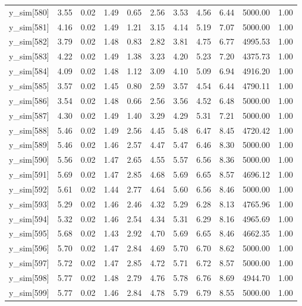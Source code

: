 \begin{table}[ht]
\begin{tabular}{rrrrrrrrrrr}
  y\_sim[580] & 3.55 & 0.02 & 1.49 & 0.65 & 2.56 & 3.53 & 4.56 & 6.44 & 5000.00 & 1.00 \\ 
  y\_sim[581] & 4.16 & 0.02 & 1.49 & 1.21 & 3.15 & 4.14 & 5.19 & 7.07 & 5000.00 & 1.00 \\ 
  y\_sim[582] & 3.79 & 0.02 & 1.48 & 0.83 & 2.82 & 3.81 & 4.75 & 6.77 & 4995.53 & 1.00 \\ 
  y\_sim[583] & 4.22 & 0.02 & 1.49 & 1.38 & 3.23 & 4.20 & 5.23 & 7.20 & 4375.73 & 1.00 \\ 
  y\_sim[584] & 4.09 & 0.02 & 1.48 & 1.12 & 3.09 & 4.10 & 5.09 & 6.94 & 4916.20 & 1.00 \\ 
  y\_sim[585] & 3.57 & 0.02 & 1.45 & 0.80 & 2.59 & 3.57 & 4.54 & 6.44 & 4790.11 & 1.00 \\ 
  y\_sim[586] & 3.54 & 0.02 & 1.48 & 0.66 & 2.56 & 3.56 & 4.52 & 6.48 & 5000.00 & 1.00 \\ 
  y\_sim[587] & 4.30 & 0.02 & 1.49 & 1.40 & 3.29 & 4.29 & 5.31 & 7.21 & 5000.00 & 1.00 \\ 
  y\_sim[588] & 5.46 & 0.02 & 1.49 & 2.56 & 4.45 & 5.48 & 6.47 & 8.45 & 4720.42 & 1.00 \\ 
  y\_sim[589] & 5.46 & 0.02 & 1.46 & 2.57 & 4.47 & 5.47 & 6.46 & 8.30 & 5000.00 & 1.00 \\ 
  y\_sim[590] & 5.56 & 0.02 & 1.47 & 2.65 & 4.55 & 5.57 & 6.56 & 8.36 & 5000.00 & 1.00 \\ 
  y\_sim[591] & 5.69 & 0.02 & 1.47 & 2.85 & 4.68 & 5.69 & 6.65 & 8.57 & 4696.12 & 1.00 \\ 
  y\_sim[592] & 5.61 & 0.02 & 1.44 & 2.77 & 4.64 & 5.60 & 6.56 & 8.46 & 5000.00 & 1.00 \\ 
  y\_sim[593] & 5.29 & 0.02 & 1.46 & 2.46 & 4.32 & 5.29 & 6.28 & 8.13 & 4765.96 & 1.00 \\ 
  y\_sim[594] & 5.32 & 0.02 & 1.46 & 2.54 & 4.34 & 5.31 & 6.29 & 8.16 & 4965.69 & 1.00 \\ 
  y\_sim[595] & 5.68 & 0.02 & 1.43 & 2.92 & 4.70 & 5.69 & 6.65 & 8.46 & 4662.35 & 1.00 \\ 
  y\_sim[596] & 5.70 & 0.02 & 1.47 & 2.84 & 4.69 & 5.70 & 6.70 & 8.62 & 5000.00 & 1.00 \\ 
  y\_sim[597] & 5.72 & 0.02 & 1.47 & 2.85 & 4.72 & 5.71 & 6.72 & 8.57 & 5000.00 & 1.00 \\ 
  y\_sim[598] & 5.77 & 0.02 & 1.48 & 2.79 & 4.76 & 5.78 & 6.76 & 8.69 & 4944.70 & 1.00 \\ 
  y\_sim[599] & 5.77 & 0.02 & 1.46 & 2.84 & 4.78 & 5.79 & 6.79 & 8.55 & 5000.00 & 1.00 \\ 

\end{tabular}
\end{table}
